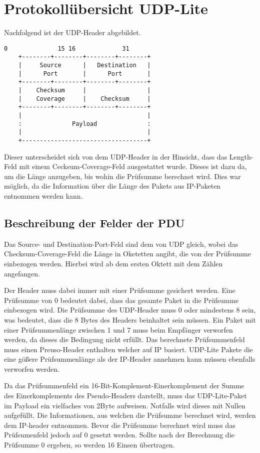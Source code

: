 \documentclass{template}
\begin{document}
\section{Protokollübersicht {\secit UDP-Lite}}

Nachfolgend ist der UDP-Header abgebildet.

\begin{lstlisting}[linewidth=0.47\textwidth]
     0              15 16             31
    +--------+--------+--------+--------+
    |     Source      |   Destination   |
    |      Port       |      Port       |
    +--------+--------+--------+--------+
    |    Checksum     |                 |
    |    Coverage     |    Checksum     |
    +--------+--------+--------+--------+
    |                                   |
    :              Payload              :
    |                                   |
    +-----------------------------------+
\end{lstlisting}
\cite{rfc:udplite}

Dieser unterscheidet sich von dem UDP-Header in der Hinsicht, dass
das Length-Feld mit einem Cecksum-Coverage-Feld ausgestattet wurde.
Dieses ist dazu da, um die Länge anzugeben, bis wohin die Prüfsumme
berechnet wird. Dies war möglich, da die Information über die Länge
des Pakets aus IP-Paketen entnommen werden kann.

\subsection{Beschreibung der Felder der PDU}

Das Source- und Destination-Port-Feld sind dem von UDP gleich, wobei
das Checksum-Coverage-Feld die Länge in Oketetten angibt, die von
der Prüfsumme einbezogen werden. Hierbei wird ab dem ersten Oktett
mit dem Zählen angefangen. 

Der Header muss dabei immer mit einer Prüfsumme gesichert werden.
Eine Prüfsumme von 0 bedeutet dabei, dass das gesamte Paket in die
Prüfsumme einbezogen wird. Die Prüfsumme des UDP-Header muss 0 oder
mindestens 8 sein, was bedeutet, dass die 8 Bytes des Headers beinhaltet
sein müssen. Ein Paket mit einer Prüfsummenlänge zwischen 1 und 7 muss
beim Empfänger verworfen werden, da dieses die Bedingung nicht erfüllt.
Das berechnete Prüfsummenfeld muss einen Preuso-Header enthalten welcher
auf IP basiert. UDP-Lite Pakete die eine gößere Prüfsummenlänge als
der IP-Header annehmen kann müssen ebenfalls verworfen werden.

Da das Prüfsummenfeld ein 16-Bit-Komplement-Einerkomplement der Summe
des Einerkomplements des Pseudo-Headers darstellt, muss das UDP-Lite-Paket
im Payload ein vielfaches von 2Byte aufweisen. Notfalls wird dieses mit
Nullen aufgefüllt. Die Informationen, aus welchen die Prüfsumme berechnet
wird, werden dem IP-header entnommen. Bevor die Prüfsumme berechnet wird
muss das Prüfsumenfeld jedoch auf 0 gesetzt werden. Sollte nach der
Berechnung die Prüfsumme 0 ergeben, so werden 16 Einsen übertragen.
\end{document}
